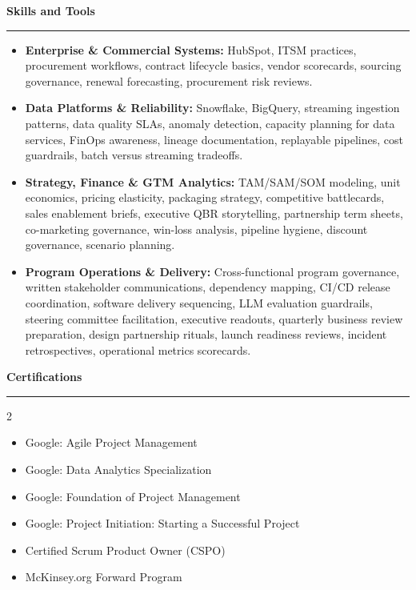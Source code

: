 \documentclass[9pt,letterpaper]{article} %
\newenvironment{rSection}[1]{ %
  \sectionskip
 \textbf{\Large #1} %
  \sectionlineskip
  \hrule %
  \begin{list}{}{ %
    \setlength{\leftmargin}{-0em} %
  }
  \item[]
}{
  \end{list}
}
\def\sectionlineskip{\smallskip} %
\def\sectionskip{} %
\begin{document}
\begin{rSection}{Skills and Tools}
\begin{itemize}[left=-1.5em, labelsep=.1cm, labelwidth=.2cm, itemsep=0.0em, topsep=0pt]
\item \textbf{Enterprise \& Commercial Systems:} HubSpot, ITSM practices, procurement workflows, contract lifecycle basics, vendor scorecards, sourcing governance, renewal forecasting, procurement risk reviews.
\item \textbf{Data Platforms \& Reliability:} Snowflake, BigQuery, streaming ingestion patterns, data quality SLAs, anomaly detection, capacity planning for data services, FinOps awareness, lineage documentation, replayable pipelines, cost guardrails, batch versus streaming tradeoffs.
\item \textbf{Strategy, Finance \& GTM Analytics:} TAM/SAM/SOM modeling, unit economics, pricing elasticity, packaging strategy, competitive battlecards, sales enablement briefs, executive QBR storytelling, partnership term sheets, co-marketing governance, win-loss analysis, pipeline hygiene, discount governance, scenario planning.
\item \textbf{Program Operations \& Delivery:} Cross-functional program governance, written stakeholder communications, dependency mapping, CI/CD release coordination, software delivery sequencing, LLM evaluation guardrails, steering committee facilitation, executive readouts, quarterly business review preparation, design partnership rituals, launch readiness reviews, incident retrospectives, operational metrics scorecards.
\end{itemize}
\end{rSection}%
\begin{rSection}{Certifications}
\begin{multicols}{2}
\begin{itemize}[left=-1.5em, labelsep=.1cm, labelwidth=.2cm, itemsep=0.0em, topsep=0pt]
\item Google: Agile Project Management
\item Google: Data Analytics Specialization
\item Google: Foundation of Project Management
\item Google: Project Initiation: Starting a Successful Project
\item Certified Scrum Product Owner (CSPO)
\item McKinsey.org Forward Program
\end{itemize}
\end{multicols}
\end{rSection}
\end{document}
